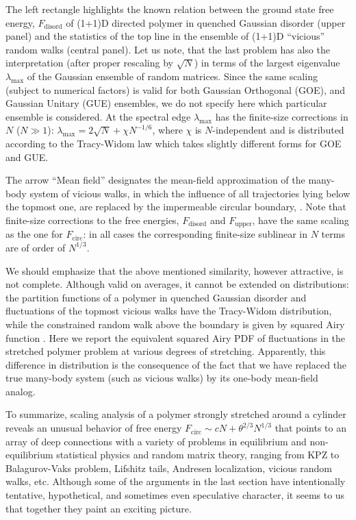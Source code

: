 \documentclass[aps,pre,floatfix,twocolumn,nofootinbib]{revtex4-2}
\begin{document}
The left rectangle highlights the known relation between the ground state free energy, $F_{\mathrm{disord}}$ of (1+1)D directed polymer in quenched Gaussian disorder \cite{dotsenko} (upper panel) and the statistics of the top line in the ensemble of (1+1)D ``vicious'' random walks \cite{schehr08} (central panel). Let us note, that the last problem has also the interpretation (after proper rescaling by $\sqrt{N}$) in terms of the largest eigenvalue $\lambda_{\max}$ of the Gaussian ensemble of random matrices. Since the same scaling (subject to numerical factors) is valid for both Gaussian Orthogonal (GOE), and Gaussian Unitary (GUE) ensembles, we do not specify here which particular ensemble is considered. At the spectral edge $\lambda_{\max}$  has the finite-size corrections in $N$ ($N\gg 1$): $\lambda_{\max} = 2\sqrt{N} +\chi N^{-1/6}$, where $\chi$ is $N$-independent and is distributed according to the Tracy-Widom law which takes slightly different forms for GOE and GUE.

The arrow ``Mean field'' designates the mean-field approximation of the many-body system of vicious walks, in which the influence of all trajectories lying below the topmost one, are replaced by the impermeable circular boundary, \cite{spohn_ferrari}. Note that finite-size corrections to the free energies, $F_{\mathrm{disord}}$ and $F_{\mathrm{upper}}$, have the same scaling as the one for $F_{\mathrm{circ}}$: in all cases the corresponding finite-size sublinear in $N$ terms are of order of $N^{1/3}$.

We should emphasize that the above mentioned similarity, however attractive, is not complete.  Although valid on averages, it cannot be extended on distributions: the partition functions of a polymer in quenched Gaussian disorder and fluctuations of the topmost vicious walks have the Tracy-Widom distribution, while the constrained random walk above the boundary is given by squared Airy function \cite{spohn_ferrari,valov_fixman}. Here we report the equivalent squared Airy PDF of fluctuations in the stretched polymer problem at various degrees of stretching. Apparently, this difference in distribution is the consequence of the fact that we have replaced the true many-body system (such as vicious walks) by its one-body mean-field analog.

To summarize, scaling analysis of a polymer strongly stretched around a cylinder reveals an unusual behavior of free energy $F_{\mathrm{circ}} \sim cN + \theta^{2/3}N^{1/3}$ that points to an array of deep connections with a variety of problems in equilibrium and non-equilibrium statistical physics and random matrix theory, ranging from KPZ to Balagurov-Vaks problem, Lifshitz tails, Andresen localization, vicious random walks, etc.  Although some of the arguments in the last section have intentionally tentative, hypothetical, and sometimes even speculative character, it seems to us that together they paint an exciting picture.
\end{document}
